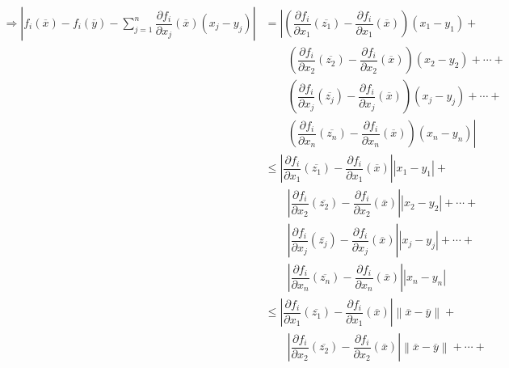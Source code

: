 \documentclass[fleqn]{article}
\begin{document}
    \begin{equation*}
        \begin{split}
            \Longrightarrow \left\lvert f_i(\overline{x}) - f_i(\overline{y}) - \sum_{j=1}^{n} \dfrac{\partial f_i}{\partial x_j} (\overline{x}) \left( x_j - y_j \right) \right\rvert &= \left\lvert \left( \dfrac{\partial f_i}{\partial x_1} (\overline{z_1}) - \dfrac{\partial f_i}{\partial x_1} (\overline{x}) \right) \left( x_1 - y_1 \right) + \right. \\
            & \qquad \left( \dfrac{\partial f_i}{\partial x_2} (\overline{z_2}) - \dfrac{\partial f_i}{\partial x_2} (\overline{x}) \right) \left( x_2 - y_2 \right) + \cdots + \\
            & \qquad \left( \dfrac{\partial f_i}{\partial x_j} (\overline{z_j}) - \dfrac{\partial f_i}{\partial x_j} (\overline{x}) \right) \left( x_j - y_j \right) + \cdots + \\
            & \qquad \left. \left( \dfrac{\partial f_i}{\partial x_n} (\overline{z_n}) - \dfrac{\partial f_i}{\partial x_n} (\overline{x}) \right) \left( x_n - y_n \right) \right\rvert \\
            &\leq \left\lvert \dfrac{\partial f_i}{\partial x_1} (\overline{z_1}) - \dfrac{\partial f_i}{\partial x_1} (\overline{x}) \right\rvert \left\lvert x_1 - y_1 \right\rvert + \\
            & \qquad \left\lvert \dfrac{\partial f_i}{\partial x_2} (\overline{z_2}) - \dfrac{\partial f_i}{\partial x_2} (\overline{x}) \right\rvert \left\lvert x_2 - y_2 \right\rvert + \cdots + \\
            & \qquad \left\lvert \dfrac{\partial f_i}{\partial x_j} (\overline{z_j}) - \dfrac{\partial f_i}{\partial x_j} (\overline{x}) \right\rvert \left\lvert x_j - y_j \right\rvert + \cdots + \\
            & \qquad \left\lvert \dfrac{\partial f_i}{\partial x_n} (\overline{z_n}) - \dfrac{\partial f_i}{\partial x_n} (\overline{x}) \right\rvert \left\lvert x_n - y_n \right\rvert \\
            &\leq \left\lvert \dfrac{\partial f_i}{\partial x_1} (\overline{z_1}) - \dfrac{\partial f_i}{\partial x_1} (\overline{x}) \right\rvert \left\lVert \overline{x} - \overline{y} \right\rVert + \\
            & \qquad \left\lvert \dfrac{\partial f_i}{\partial x_2} (\overline{z_2}) - \dfrac{\partial f_i}{\partial x_2} (\overline{x}) \right\rvert \left\lVert \overline{x} - \overline{y} \right\rVert + \cdots + \\

\end{split}
\end{equation*}
\end{document}

